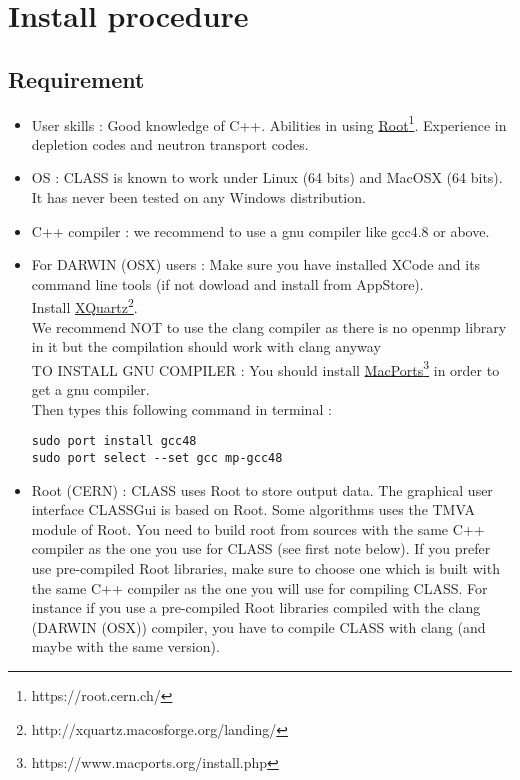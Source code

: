 \chapter{Install procedure}

\section{Requirement}
\begin{center}
\begin{minipage}{\textwidth}
\begin{itemize}
\item User skills : Good knowledge of C++. Abilities in using \href{https://root.cern.ch/}{Root}\footnote{https://root.cern.ch/}.
Experience in depletion codes and neutron transport codes.
\item OS : CLASS is known to work under Linux (64  bits) and MacOSX (64 bits). It  has never been tested on any Windows distribution.
\item C++ compiler :  we recommend to use a gnu compiler like gcc4.8 or above.
\item For DARWIN (OSX) users : 
Make sure you have installed XCode and its command line tools (if not dowload and install from AppStore).\\ 
Install \href{http://xquartz.macosforge.org/landing/}{XQuartz}\footnote{http://xquartz.macosforge.org/landing/}.\\
We recommend NOT to use the clang compiler as there is no openmp library in it but the compilation should work with clang anyway\\
TO INSTALL GNU COMPILER : You should install  \href{https://www.macports.org/install.php}{MacPorts}\footnote{https://www.macports.org/install.php} in order to get a gnu compiler.\\
Then types this following command in terminal :\\
\begin{lstlisting}[style=terminal]
sudo port install gcc48
sudo port select --set gcc mp-gcc48
\end{lstlisting}
\item Root (CERN) :  
CLASS uses Root to store output data. 
The graphical user interface CLASSGui is based on Root.
Some algorithms uses the TMVA module of Root. You need to build root from sources with the same C++ compiler as the one you use for CLASS (see first note below). If you prefer use pre-compiled Root libraries, make sure to choose one which is built with the same C++ compiler as the one you will use for compiling CLASS.
For instance if you use a pre-compiled Root libraries compiled with the clang (DARWIN (OSX)) compiler, you have to compile CLASS with clang (and maybe with the same version). 

\end{itemize}
\end{minipage}
\end{center}

